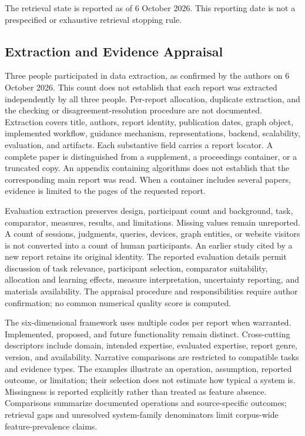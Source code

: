 \documentclass[manuscript,review,screen]{acmart}
\begin{document}
The retrieval state is reported as of 6 October 2026. This reporting date is not a prespecified or exhaustive retrieval stopping rule.


\subsection{Extraction and Evidence Appraisal}
Three people participated in data extraction, as confirmed by the authors on 6 October 2026. This count does not establish that each report was extracted independently by all three people. Per-report allocation, duplicate extraction, and the checking or disagreement-resolution procedure are not documented. Extraction covers title, authors, report identity, publication dates, graph object, implemented workflow, guidance mechanism, representations, backend, scalability, evaluation, and artifacts. Each substantive field carries a report locator. A complete paper is distinguished from a supplement, a proceedings container, or a truncated copy. An appendix containing algorithms does not establish that the corresponding main report was read. When a container includes several papers, evidence is limited to the pages of the requested report.

Evaluation extraction preserves design, participant count and background, task, comparator, measures, results, and limitations. Missing values remain unreported. A count of sessions, judgments, queries, devices, graph entities, or website visitors is not converted into a count of human participants. An earlier study cited by a new report retains its original identity. The reported evaluation details permit discussion of task relevance, participant selection, comparator suitability, allocation and learning effects, measure interpretation, uncertainty reporting, and materials availability. The appraisal procedure and responsibilities require author confirmation; no common numerical quality score is computed.

The six-dimensional framework uses multiple codes per report when warranted. Implemented, proposed, and future functionality remain distinct. Cross-cutting descriptors include domain, intended expertise, evaluated expertise, report genre, version, and availability. Narrative comparisons are restricted to compatible tasks and evidence types. The examples illustrate an operation, assumption, reported outcome, or limitation; their selection does not estimate how typical a system is. Missingness is reported explicitly rather than treated as feature absence. Comparisons summarize documented operations and source-specific outcomes; retrieval gaps and unresolved system-family denominators limit corpus-wide feature-prevalence claims.
\end{document}
